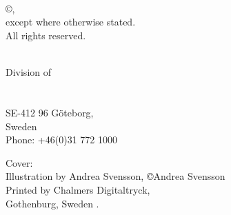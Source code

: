 \newpage
\thispagestyle{empty}

\vspace{2cm} \noindent \textbf
\mytitle\\
\ifx\mysubtitle\undefined
\else
  \textit{\small\mysubtitle}
  \\
\fi

\noindent
\textsc{\authorname}\\

\vskip 0.5cm\noindent
\copyright \space \authorname,~\currentyear  \\
\noindent
except where otherwise stated. \\
All rights reserved. \vspace{1cm}


\vfill

\noindent \identifierNoText

\noindent 
\mydepartment\\
Division of \division\\
\ifx\researchgroup\undefined\else\researchgroup\\\fi
\chalIgu\\
SE-412 96 Göteborg,\\
Sweden\\
Phone: +46(0)31 772 1000

\vskip 1.5cm

Cover:\\
 Illustration by Andrea Svensson, \copyright \space Andrea Svensson
\\

\noindent
Printed by Chalmers Digitaltryck,\\
Gothenburg, Sweden \currentyear.
